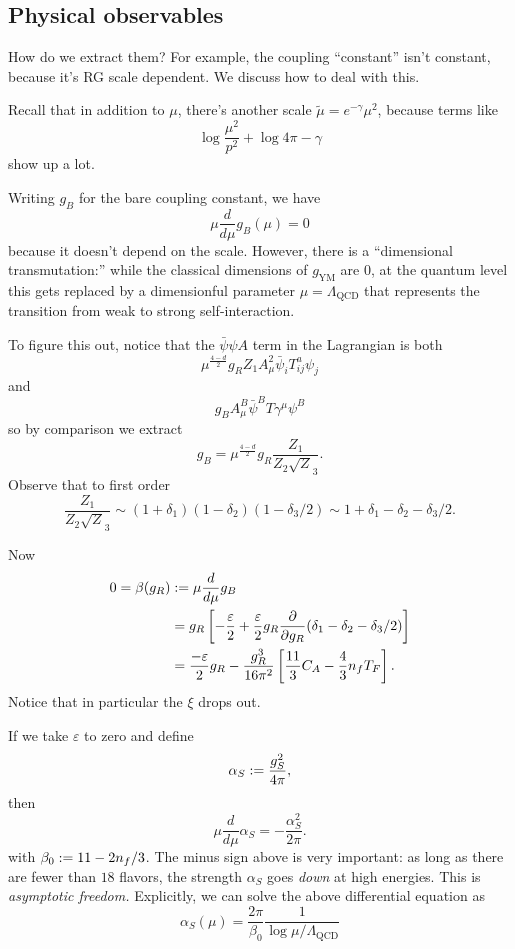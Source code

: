 \subsection*{Physical observables}
How do we extract them?
For example, the coupling ``constant'' isn't constant, because it's RG scale dependent.
We discuss how to deal with this.

Recall that in addition to $\mu$, there's another scale $\tilde \mu = e^{- \gamma} \mu^2$, because terms like
\[
\log \frac{\mu^2}{p^2} + \log 4 \pi - \gamma
\]
show up a lot.

Writing $g_B$ for the bare coupling constant, we have
\[
\mu \frac{d}{d \mu} g_B(\mu) = 0
\]
because it doesn't depend on the scale.
However, there is a ``dimensional transmutation:'' while the classical dimensions of $g_{\text{YM}}$ are $0$, at the quantum level this gets replaced by a dimensionful parameter $\mu = \Lambda_{\text{QCD}}$ that represents the transition from weak to strong self-interaction.


To figure this out, notice that the $\bar \psi \psi A$ term in the Lagrangian is both
\[
\mu^{\frac{4-d}{2}} g_R Z_1 A^2_\mu \bar \psi_i T_{ij}^a \psi_j
\]
and
\[
g_B A_\mu^B \bar \psi^B T \gamma^\mu \psi^B
\]
so by comparison we extract
\[
g_B = \mu^{\frac{4-d}{2}} g_R \frac{Z_1}{Z_2 \sqrt Z_3}.
\]
Observe that to first order
\[
\frac{Z_1}{Z_2 \sqrt Z_3} \sim (1 + \delta_1)(1 - \delta_2)(1 - \delta_3/2) \sim 1 + \delta_1 - \delta_2 - \delta_3 /2.
\]

Now
\begin{align*}
0 = \beta(g_R) &:= \mu \frac{d}{d \mu} g_B \\
&= g_R \left[ - \frac{\varepsilon}{2} + \frac{\varepsilon}{2} g_R \frac{\partial}{\partial g_R}(\delta_1 - \delta_2 - \delta_3/2) \right]\\
&= \frac{- \varepsilon}{2} g_R - \frac{g_R^3}{16 \pi^2}\left[ \frac{11}{3} C_A - \frac{4}{3} n_f T_F \right].
\end{align*}
Notice that in particular the $\xi$ drops out.

If we take $\varepsilon$ to zero and define
\[
\alpha_S := \frac{g_S^2}{4 \pi},
\]
then 
\[
\mu \frac{d}{d \mu} \alpha_S = - \frac{\alpha_S^2}{2 \pi}.
\]
with  $\beta_0 := 11 - 2 n_f /3$.
The minus sign above is very important: as long as there are fewer than $18$ flavors, the strength $\alpha_S$ goes \emph{down} at high energies.
This is \emph{asymptotic freedom.}
Explicitly, we can solve the above differential equation as
\[
\alpha_S(\mu) = \frac{2 \pi}{\beta_0} \frac{1}{\log \mu / \Lambda_{\text{QCD}}}
\]

